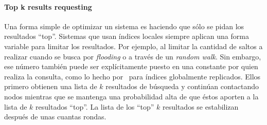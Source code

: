 \paragraph{Top k results requesting~\cite{cuenca2003planetp}} %
Una forma simple de optimizar un sistema es haciendo que sólo se pidan los
resultados ``top''. Sistemas que usan índices locales siempre aplican una forma
variable para limitar los resultados. Por ejemplo, al limitar la cantidad de saltos a realizar
cuando se busca por \textit{flooding} o a través de un \textit{random walk}.
Sin embargo, ese número también puede ser explícitamente puesto en una
constante por quien realiza la consulta, como lo hecho por~\citealt{cuenca2003planetp} %
para índices globalmente replicados. Ellos primero obtienen una lista de $k$
resultados de búsqueda y continúan contactando nodos mientras que se mantenga una
probabilidad alta de que éstos aporten a la lista de $k$ resultados ``top''. La lista de
los ``top'' $k$ resultados se estabilizan después de unas cuantas rondas.

